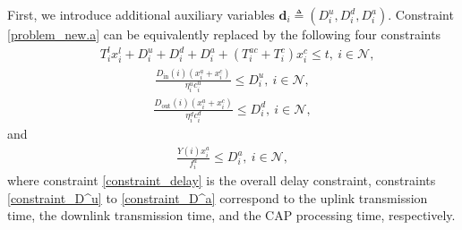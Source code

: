 \documentclass[10pt,journal,compsoc]{IEEEtran}
\begin{document}
First, we introduce additional auxiliary variables
$\textbf{d}_i\triangleq(D^u_{i},D^d_{i},D^a_{i})$. Constraint
\eqref{problem_new.a} can be equivalently replaced by the following
four constraints
\begin{align}\label{constraint_delay}
&T^l_{i}x^l_{i}+D^u_{i}+D^d_{i}+D^a_{i}+(T^{ac}_i+T^{c}_i)x^c_{i}\leq
t,\ i\in\mathcal{N},
\end{align}
\begin{align}\label{constraint_D^u}
\frac{D_{{\textrm{in}}}(i)(x^a_{i}+x^c_{i})}{\eta^u_ic^u_{i}}\leq
D^u_{i},\ i\in\mathcal{N},
\end{align}
\begin{align}\label{constraint_D^d}
\frac{D_{{\textrm{out}}}(i)(x^a_{i}+x^c_{i})}{\eta^d_ic^d_{i}}\leq
D^d_{i},\ i\in\mathcal{N},
\end{align}
and
\begin{align}\label{constraint_D^a}
\frac{Y(i)x^a_{i}}{f^a_i}\leq D^a_{i},\ i\in\mathcal{N},
\end{align}
where constraint \eqref{constraint_delay} is the overall delay
constraint, constraints \eqref{constraint_D^u} to
\eqref{constraint_D^a} correspond to the uplink transmission time,
the downlink transmission time, and the CAP processing time,
respectively.
\end{document}

